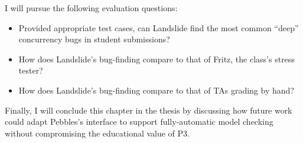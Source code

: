 I will pursue the following evaluation questions:

\begin{itemize}
	\item Provided appropriate test cases, can Landslide find the most common ``deep'' concurrency bugs in student submissions?
	\item How does Landslide's bug-finding compare to that of Fritz, the class's stress tester?
	\item How does Landslide's bug-finding compare to that of TAs grading by hand?
\end{itemize}

Finally, I will conclude this chapter in the thesis by discussing how future work could adapt Pebbles's interface to support fully-automatic model checking without compromising the educational value of P3.
